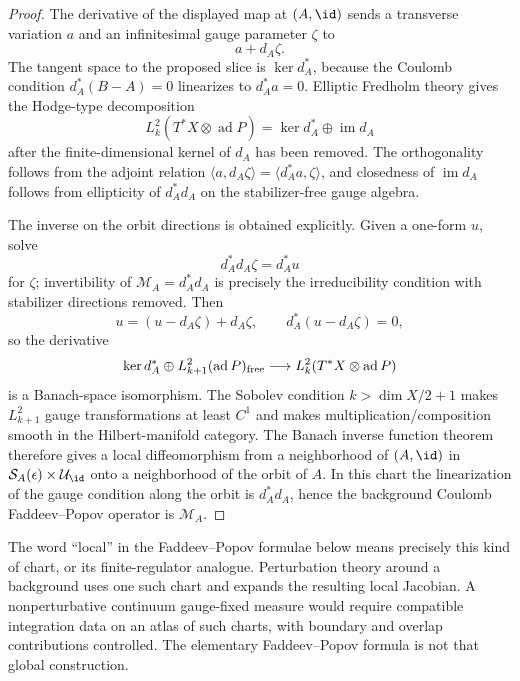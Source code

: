\begin{proof}
The derivative of the displayed map at \((A,\id)\) sends a transverse
variation \(a\) and an infinitesimal gauge parameter \(\zeta\) to
\[
  a+d_A\zeta .
\]
The tangent space to the proposed slice is \(\ker d_A^*\), because the
Coulomb condition \(d_A^*(B-A)=0\) linearizes to \(d_A^*a=0\).  Elliptic
Fredholm theory gives the Hodge-type decomposition
\[
  L^2_k(T^*X\otimes\operatorname{ad}P)
  =
  \ker d_A^*
  \oplus
  \operatorname{im}d_A
\]
after the finite-dimensional kernel of \(d_A\) has been removed.  The
orthogonality follows from the adjoint relation
\(\langle a,d_A\zeta\rangle=\langle d_A^*a,\zeta\rangle\), and closedness of
\(\operatorname{im}d_A\) follows from ellipticity of \(d_A^*d_A\) on the
stabilizer-free gauge algebra.

The inverse on the orbit directions is obtained explicitly.  Given a
one-form \(u\), solve
\[
  d_A^*d_A\zeta=d_A^*u
\]
for \(\zeta\); invertibility of \(\mathcal M_A=d_A^*d_A\) is precisely the
irreducibility condition with stabilizer directions removed.  Then
\[
  u=(u-d_A\zeta)+d_A\zeta,
  \qquad
  d_A^*(u-d_A\zeta)=0,
\]
so the derivative
\[
  \ker d_A^*\oplus L^2_{k+1}(\operatorname{ad}P)_{\rm free}
  \longrightarrow
  L^2_k(T^*X\otimes\operatorname{ad}P)
\]
is a Banach-space isomorphism.  The Sobolev condition
\(k>\dim X/2+1\) makes \(L^2_{k+1}\) gauge transformations at least
\(C^1\) and makes multiplication/composition smooth in the Hilbert-manifold
category.  The Banach inverse function theorem therefore gives a local
diffeomorphism from a neighborhood of \((A,\id)\) in
\(\mathcal S_A(\epsilon)\times\mathcal U_{\id}\) onto a neighborhood of the
orbit of \(A\).  In this chart the linearization of the gauge condition along
the orbit is \(d_A^*d_A\), hence the background Coulomb Faddeev--Popov
operator is \(\mathcal M_A\).
\end{proof}

The word ``local'' in the Faddeev--Popov formulae below means precisely this
kind of chart, or its finite-regulator analogue.  Perturbation theory around a
background uses one such chart and expands the resulting local Jacobian.  A
nonperturbative continuum gauge-fixed measure would require compatible
integration data on an atlas of such charts, with boundary and overlap
contributions controlled.  The elementary Faddeev--Popov formula is not that
global construction.

